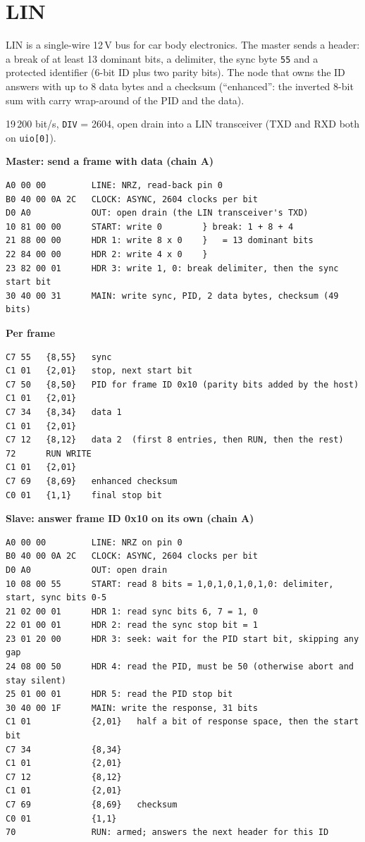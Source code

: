 \documentclass[11pt,a4paper]{article}
\newcommand{\sig}[1]{\texttt{#1}}
\newcommand{\progtitle}[1]{\par\smallskip\textbf{\small\color{accent}#1}\par\nopagebreak}
\newcommand{\facts}[1]{\par\noindent\colorbox{codebg}{\parbox{\dimexpr\linewidth-2\fboxsep}{\small #1}}\par}
\begin{document}
\section{LIN}
LIN is a single-wire 12\,V bus for car body electronics. The master sends a header: a break of at least 13 dominant bits, a delimiter, the sync byte \texttt{55} and a protected identifier (6-bit ID plus two parity bits). The node that owns the ID answers with up to 8 data bytes and a checksum (``enhanced'': the inverted 8-bit sum with carry wrap-around of the PID and the data).
\facts{19\,200 bit/s, \sig{DIV} = 2604, open drain into a LIN transceiver (TXD and RXD both on \sig{uio[0]}).}
\progtitle{Master: send a frame with data (chain A)}
\begin{lstlisting}
A0 00 00         LINE: NRZ, read-back pin 0
B0 40 00 0A 2C   CLOCK: ASYNC, 2604 clocks per bit
D0 A0            OUT: open drain (the LIN transceiver's TXD)
10 81 00 00      START: write 0        } break: 1 + 8 + 4
21 88 00 00      HDR 1: write 8 x 0    }   = 13 dominant bits
22 84 00 00      HDR 2: write 4 x 0    }
23 82 00 01      HDR 3: write 1, 0: break delimiter, then the sync start bit
30 40 00 31      MAIN: write sync, PID, 2 data bytes, checksum (49 bits)
\end{lstlisting}
\progtitle{Per frame}
\begin{lstlisting}
C7 55   {8,55}   sync
C1 01   {2,01}   stop, next start bit
C7 50   {8,50}   PID for frame ID 0x10 (parity bits added by the host)
C1 01   {2,01}
C7 34   {8,34}   data 1
C1 01   {2,01}
C7 12   {8,12}   data 2  (first 8 entries, then RUN, then the rest)
72      RUN WRITE
C1 01   {2,01}
C7 69   {8,69}   enhanced checksum
C0 01   {1,1}    final stop bit
\end{lstlisting}
\progtitle{Slave: answer frame ID 0x10 on its own (chain A)}
\begin{lstlisting}
A0 00 00         LINE: NRZ on pin 0
B0 40 00 0A 2C   CLOCK: ASYNC, 2604 clocks per bit
D0 A0            OUT: open drain
10 08 00 55      START: read 8 bits = 1,0,1,0,1,0,1,0: delimiter, start, sync bits 0-5
21 02 00 01      HDR 1: read sync bits 6, 7 = 1, 0
22 01 00 01      HDR 2: read the sync stop bit = 1
23 01 20 00      HDR 3: seek: wait for the PID start bit, skipping any gap
24 08 00 50      HDR 4: read the PID, must be 50 (otherwise abort and stay silent)
25 01 00 01      HDR 5: read the PID stop bit
30 40 00 1F      MAIN: write the response, 31 bits
C1 01            {2,01}   half a bit of response space, then the start bit
C7 34            {8,34}
C1 01            {2,01}
C7 12            {8,12}
C1 01            {2,01}
C7 69            {8,69}   checksum
C0 01            {1,1}
70               RUN: armed; answers the next header for this ID
\end{lstlisting}
\end{document}
